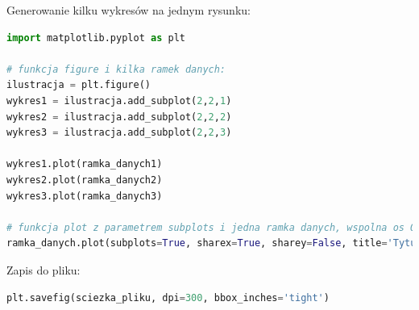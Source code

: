 \documentclass[11pt]{report}
\begin{document}
Generowanie kilku wykresów na jednym rysunku:

\begin{lstlisting}[language=Python]
import matplotlib.pyplot as plt

# funkcja figure i kilka ramek danych:
ilustracja = plt.figure()
wykres1 = ilustracja.add_subplot(2,2,1)
wykres2 = ilustracja.add_subplot(2,2,2)
wykres3 = ilustracja.add_subplot(2,2,3)

wykres1.plot(ramka_danych1)
wykres2.plot(ramka_danych2)
wykres3.plot(ramka_danych3)

# funkcja plot z parametrem subplots i jedna ramka danych, wspolna os OX:
ramka_danych.plot(subplots=True, sharex=True, sharey=False, title='Tytul', sort_columns=True)
\end{lstlisting}

Zapis do pliku:

\begin{lstlisting}[language=Python]
    plt.savefig(sciezka_pliku, dpi=300, bbox_inches='tight')
\end{lstlisting}


\printbibliography[heading=subbibliography,title={Strony internetowe},keyword=www]
\end{document}
